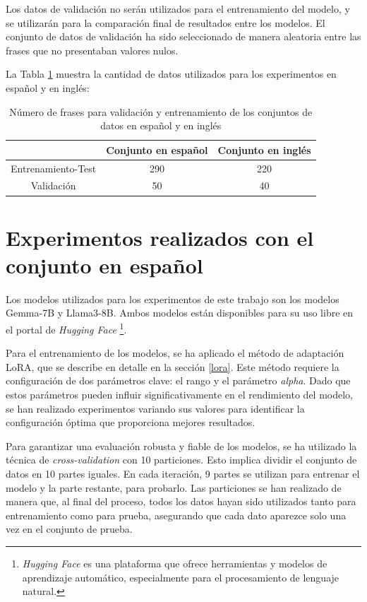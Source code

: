 \documentclass[11pt,spanish,listoffigures,listoftables]{tfgetsinf}
\begin{document}
Los datos de validación no serán utilizados para el entrenamiento del modelo, y se utilizarán para la comparación final de resultados entre los modelos. El conjunto de datos de validación ha sido seleccionado de manera aleatoria entre las frases que no presentaban valores nulos.

La Tabla \ref{tab:frases} muestra la cantidad de datos utilizados para los experimentos en español y en inglés:

\begin{table}[!h]
\caption{Número de frases para validación y entrenamiento de los conjuntos de datos en español y en inglés}
\begin{center}
\begin{tabular}{  c || c  c  }
	\ & Conjunto en español & Conjunto en inglés \\
	\hline
	Entrenamiento-Test & 290 & 220 \\
	Validación & 50 & 40
\end{tabular}
\end{center}
\label{tab:frases}
\end{table}

\section{Experimentos realizados con el conjunto en español}

Los modelos utilizados para los experimentos de este trabajo son los modelos Gemma-7B y Llama3-8B. Ambos modelos están disponibles para su uso libre en el portal de \textit{Hugging Face} \footnote{\textit{Hugging Face} es una plataforma que ofrece herramientas y modelos de aprendizaje automático, especialmente para el procesamiento de lenguaje natural.}.

Para el entrenamiento de los modelos, se ha  aplicado el método de adaptación LoRA, que se describe en detalle en la sección \ref{lora}. Este método requiere la configuración de dos parámetros clave: el rango y el parámetro \textit{alpha}. Dado que estos parámetros pueden influir significativamente en el rendimiento del modelo, se han realizado experimentos variando sus valores para identificar la configuración óptima que proporciona mejores resultados.

Para garantizar una evaluación robusta y fiable de los modelos, se ha utilizado la técnica de \textit{cross-validation} con 10 particiones. Esto implica dividir el conjunto de datos en 10 partes iguales. En cada iteración, 9 partes se utilizan para entrenar el modelo y la parte restante, para probarlo. Las particiones se han realizado de manera que, al final del proceso, todos los datos hayan sido utilizados tanto para entrenamiento como para prueba, asegurando que cada dato aparezce solo una vez en el conjunto de prueba.
\end{document}
